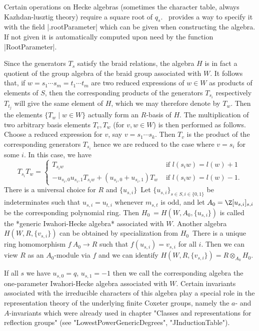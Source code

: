 Certain operations on Hecke algebras (sometimes the character table, always
Kazhdan-lusztig theory) require a square root of $q_s$. \CHEVIE\ provides a
way  to specify it with the field  |.rootParameter| which can be given when
constructing  the algebra. If  not given it  is automatically computed upon
need by the function |RootParameter|.

Since  the generators $T_s$ satisfy the braid relations, the algebra $H$ is
in  fact a quotient of the group algebra of the braid group associated with
$W$. It follows that, if $w=s_1 \cdots s_m= t_1 \cdots t_m$ are two reduced
expressions  of  $w  \in  W$  as  products  of  elements  of  $S$, then the
corresponding  products of the  generators $T_{s_i}$ respectively $T_{t_j}$
will  give the same element of $H$, which we may therefore denote by $T_w$.
Then the elements $\{T_w \mid w \in W\}$ actually form an $R$-basis of $H$.
The  multiplication of two arbitrary basis elements $T_v,T_w$ (for $v,w \in
W$)  is then performed as follows. Choose a reduced expression for $v$, say
$v=s_1  \cdots  s_k$.  Then  $T_v$  is  the  product  of  the corresponding
generators  $T_{s_i}$ hence  we are  reduced to  the case where $v=s_i$ for
some $i$. In this case, we have
$$
 T_{s_i}T_w = \left\{ \begin{array}{cl}
   T_{s_iw} & \mbox{ if  $l(s_iw)=l(w)+1$}\\
   -u_{s_i,0}u_{s_i,1}T_{s_iw}+(u_{s_i,0}+u_{s_i,1})T_w &
     \mbox{ if $l(s_iw)=l(w)-1$.}
  \end{array}\right.
$$
There   is   a   universal   choice   for   $R$  and  $\{u_{s,i}\}$\:\  Let
$\{u_{s,i}\}_{s\in    S,i\in\{0,1\}}$    be    indeterminates   such   that
$u_{s,i}=u_{t,i}$ whenever $m_{s,t}$ is odd, and let
$A_0=\Z[u_{s,i}]_{s,i}$   be  the   corresponding  polynomial   ring.  Then
$H_0\:=H(W,A_0,\{u_{s,i}\})$  is called the *generic Iwahori-Hecke algebra*
associated  with $W$. Another algebra  $H(W,R,\{v_{s,i}\})$ can be obtained
by specialization from $H_0$\:\ There is a unique ring homomorphism $f\:A_0
\rightarrow R$ such that $f(u_{s,i})=v_{s,i}$ for all $i$. Then we can view
$R$  as an $A_0$-module  via $f$ and  we can identify $H(W,R,\{v_{s,i}\})=R
\otimes_{A_0} H_0$.

If all $s$ we have $u_{s,0}=q$, $u_{s,1}=-1$ then we call the corresponding
algebra  the  one-parameter  Iwahori-Hecke  algebra  associated  with  $W$.
Certain  invariants  associated  with  the  irreducible  characters of this
algebra  play a special role in the representation theory of the underlying
finite  Coxeter  groups,  namely  the  $a$-  and  $A$-invariants which were
already used in chapter "Classes and representations for reflection groups"
(see "LowestPowerGenericDegrees", "JInductionTable").

